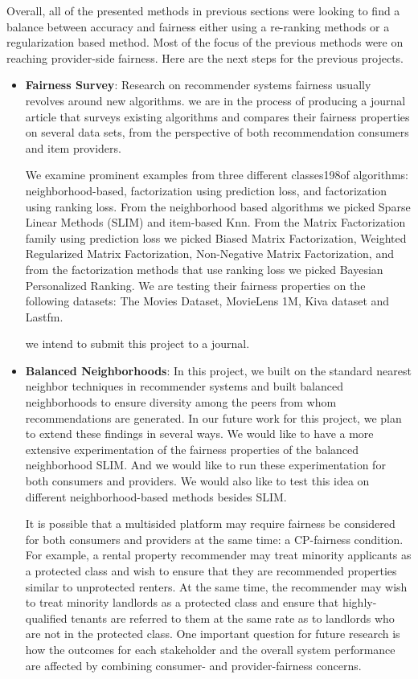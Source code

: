 Overall, all of the presented methods in previous sections were looking to find a balance between accuracy and fairness either using a re-ranking methods or a regularization based method. Most of the focus of the previous methods were on reaching provider-side fairness. Here are the next steps for the previous projects.
\begin{itemize}
    \item \textbf{Fairness Survey}: Research on recommender systems fairness usually revolves around new algorithms. we are in the process of producing a journal article that surveys existing algorithms and compares their fairness properties on several data sets, from the perspective of both recommendation consumers and item providers. 

    We examine prominent examples from three different classes198of algorithms:  neighborhood-based, factorization using prediction loss, and factorization using ranking loss. From the neighborhood based algorithms we picked Sparse Linear Methods (SLIM) and item-based Knn. From the Matrix Factorization family using prediction loss we picked Biased Matrix Factorization, Weighted Regularized Matrix Factorization, Non-Negative Matrix Factorization, and from the factorization methods that use ranking loss we picked Bayesian Personalized Ranking. We are testing their fairness properties on the following datasets: The Movies Dataset, MovieLens 1M, Kiva dataset and Lastfm.
    
    we intend to submit this project to a journal.
    
    \item \textbf{Balanced Neighborhoods}: In this project, we built on the standard nearest neighbor techniques in recommender systems and built balanced neighborhoods to ensure diversity among the peers from whom recommendations are generated. In our future work for this project, we plan to extend these findings in several ways. We would like to have a more extensive experimentation of the fairness properties of the balanced neighborhood SLIM. And we would like to run these experimentation for both consumers and providers. We would also like to test this idea on different neighborhood-based methods besides SLIM. 
    
    It is possible that a multisided platform may require fairness be considered for both consumers and providers at the same time: a CP-fairness condition. For example, a rental property recommender may treat minority applicants as a protected class and wish to ensure that they are recommended properties similar to unprotected renters. At the same time, the recommender may wish to treat minority landlords as a protected class and ensure that highly-qualified tenants are referred to them at the same rate as to landlords who are not in the protected class. One important question for future research is how the outcomes for each stakeholder and the overall system performance are affected by combining consumer- and provider-fairness concerns.
    

\end{itemize}
